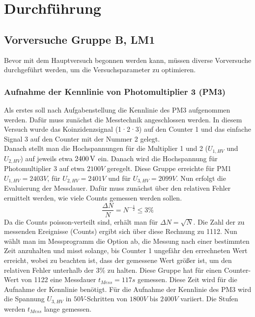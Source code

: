 \section{Durchführung}
    \subsection{Vorversuche Gruppe B, LM1}
        Bevor mit dem Hauptversuch begonnen werden kann, müssen diverse Vorversuche durchgeführt werden, um die Versuchsparameter zu optimieren.
        \subsubsection{Aufnahme der Kennlinie von Photomultiplier 3 (PM3)}
        Als erstes soll nach Aufgabenstellung die Kennlinie des PM3 aufgenommen werden. Dafür muss zunächst die Messtechnik angeschlossen werden. In diesem Versuch wurde das Koinzidenzsignal (1·2·3) auf den Counter 1 und das einfache Signal 3 auf den Counter mit der Nummer 2 gelegt.\\
        Danach stellt man die Hochspannungen für die Multiplier 1 und 2 ($U_{1,HV}$ und $U_{2,HV}$) auf jeweils etwa $\unit[2400]{V}$ ein. Danach wird die Hochspannung für Photomultiplier 3 auf etwa $2100\unit{V}$ geregelt. Diese Gruppe erreichte für PM1 $U_{1,HV} = 2403\unit{V}$, für $U_{2,HV} = 2401\unit{V}$ und für $U_{3,HV} = 2099\unit{V}$. 
        Nun erfolgt die Evaluierung der Messdauer. Dafür muss zunächst über den relativen Fehler ermittelt werden, wie viele Counts gemessen werden sollen. 
        $$ \frac{\Delta N}{N} = N^{-\frac{1}{2}} \leq 3\unit{\%}$$
        Da die Counts poisson-verteilt sind, erhält man für $\Delta N = \sqrt{N}$. Die Zahl der zu messenden Ereignisse (Counts) ergibt sich über diese Rechnung zu 1112. Nun wählt man im Messprogramm die Option ab, die Messung nach einer bestimmten Zeit anzuhalten und misst solange, bis Counter 1 ungefähr den errechneten Wert erreicht, wobei zu beachten ist, dass der gemessene Wert größer ist, um den relativen Fehler unterhalb der $3\unit{\%}$ zu halten. Diese Gruppe hat für einen Counter-Wert von 1122 eine Messdauer $t_{Mess} = 117\unit{s}$ gemessen. Diese Zeit wird für die Aufnahme der Kennlinie benötigt.
        Für die Aufnahme der Kennlinie des PM3 wird die Spannung $U_{3,HV}$ in $50\unit{V}$-Schritten von $1800\unit{V}$ bis $2400\unit{V}$ variiert. Die Stufen werden $t_{Mess}$ lange gemessen. 
